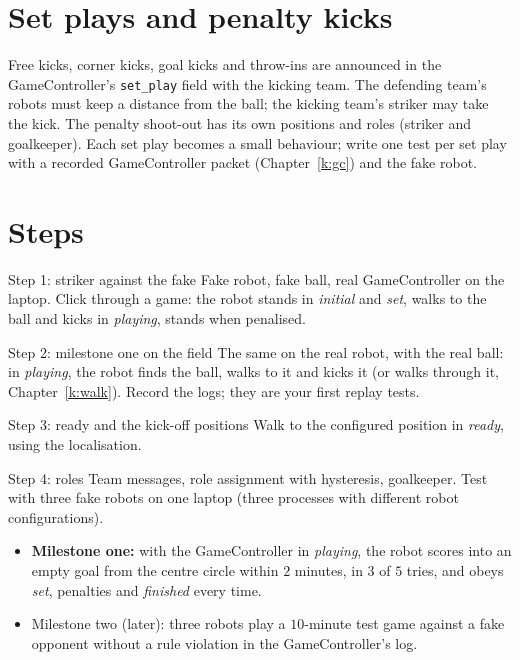 \section*{Set plays and penalty kicks}
Free kicks, corner kicks, goal kicks and throw-ins are announced in the GameController's \texttt{set\_play} field with the kicking team. The defending team's robots must keep a distance from the ball; the kicking team's striker may take the kick. The penalty shoot-out has its own positions and roles (striker and goalkeeper). Each set play becomes a small behaviour; write one test per set play with a recorded GameController packet (Chapter~\ref{k:gc}) and the fake robot.

\section*{Steps}
\begin{stepbox}{Step 1: striker against the fake}
Fake robot, fake ball, real GameController on the laptop. Click through a game: the robot stands in \emph{initial} and \emph{set}, walks to the ball and kicks in \emph{playing}, stands when penalised.
\end{stepbox}
\begin{stepbox}{Step 2: milestone one on the field}
The same on the real robot, with the real ball: in \emph{playing}, the robot finds the ball, walks to it and kicks it (or walks through it, Chapter~\ref{k:walk}). Record the logs; they are your first replay tests.
\end{stepbox}
\begin{stepbox}{Step 3: ready and the kick-off positions}
Walk to the configured position in \emph{ready}, using the localisation.
\end{stepbox}
\begin{stepbox}{Step 4: roles}
Team messages, role assignment with hysteresis, goalkeeper. Test with three fake robots on one laptop (three processes with different robot configurations).
\end{stepbox}

\begin{checkbox}
\begin{itemize}[nosep]
  \item \textbf{Milestone one:} with the GameController in \emph{playing}, the robot scores into an empty goal from the centre circle within $2$ minutes, in $3$ of $5$ tries, and obeys \emph{set}, penalties and \emph{finished} every time.
  \item Milestone two (later): three robots play a $10$-minute test game against a fake opponent without a rule violation in the GameController's log.
\end{itemize}
\end{checkbox}

